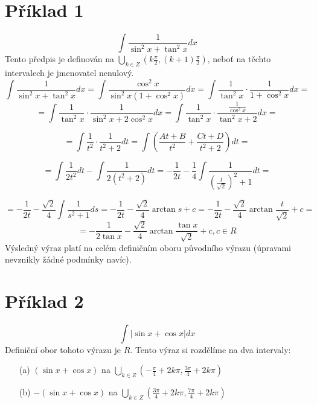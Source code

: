\documentclass{scrreprt}
\begin{document}
\section*{Příklad 1}
$$
\int \frac{1}{\sin^2 x + \tan^2 x} dx
$$
Tento předpis je definován na $\bigcup_{k \in Z} (k\frac{\pi}{2}, (k+1)\frac{\pi}{2})$, neboť na těchto intervalech je jmenovatel nenulový.
$$
\int \frac{1}{\sin^2 x + \tan^2 x} dx = \int \frac{\cos^2x}{\sin^2x(1+\cos^2x)} dx = 
\int \frac{1}{\tan^2x} \cdot \frac{1}{1+\cos^2 x} dx =
$$
$$
= \int \frac{1}{\tan^2 x} \cdot \frac{1}{\sin^2x + 2\cos^2x} dx  
= \int \frac{1}{\tan^2 x} \cdot \frac{\frac{1}{\cos^2 x}}{\tan^2 x + 2} dx =
$$
\begin{flushright}
[substituce (1): $t = \tan x, dt = \frac{1}{\cos^2 x} dx$]  
\end{flushright}
$$
= \int \frac{1}{t^2} \cdot \frac{1}{t^2+2} dt = \int \left(\frac{At+B}{t^2} + \frac{Ct+D}{t^2+2} \right) dt = 
$$
\begin{flushright}
[$A = 0$, $B = 0.5$, $C = 0$, $D = -0.5$] 
\end{flushright}
$$
= \int \frac{1}{2t^2} dt - \int \frac{1}{2(t^2+2)} dt = -\frac{1}{2t} - \frac{1}{4} \int \frac{1}{(\frac{t}{\sqrt{2}})^2 + 1} dt =
$$
\begin{flushright}
[substituce (1): $s = \frac{t}{\sqrt{2}}$, $ds = \frac{1}{\sqrt{2}} dt$]
\end{flushright}
$$
= -\frac{1}{2t} - \frac{\sqrt{2}}{4} \int \frac{1}{s^2+1} ds = -\frac{1}{2t} - \frac{\sqrt{2}}{4} \arctan s + c = -\frac{1}{2t} - \frac{\sqrt{2}}{4} \arctan \frac{t}{\sqrt{2}} + c =
$$
$$
= -\frac{1}{2 \tan x} -\frac{\sqrt{2}}{4} \arctan \frac{\tan x}{\sqrt{2}} + c, c \in R
$$
Výsledný výraz platí na celém definičním oboru původního výrazu (úpravami nevznikly žádné podmínky navíc).

\section*{Příklad 2} 
$$
\int \vert \sin x+\cos x \vert dx 
$$
Definiční obor tohoto výrazu je $R$. Tento výraz si rozdělíme na dva intervaly: 
\begin{enumerate}
\item[(a)] 
$(\sin x + \cos x)$ na $\bigcup_{k \in Z}(-\frac{\pi}{4} + 2k\pi, \frac{3\pi}{4} + 2k\pi)$
\item[(b)]
$-(\sin x + \cos x)$ na $\bigcup_{k \in Z} (\frac{3\pi}{4} + 2k\pi, \frac{7\pi}{4} + 2k\pi)$
\end{enumerate}
\end{document}

